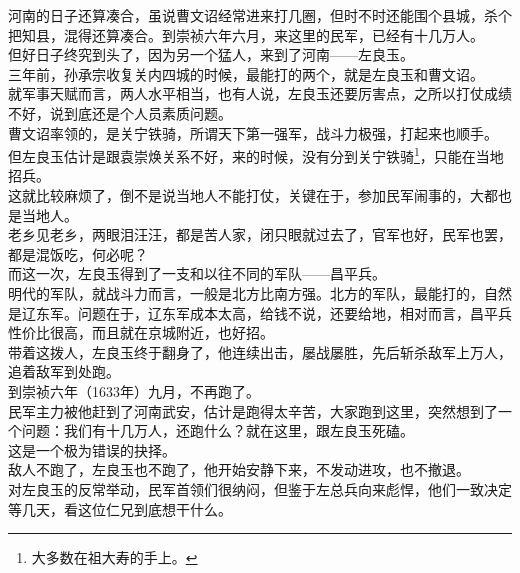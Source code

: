 \begin{multicols}{\theparacolNo}
河南的日子还算凑合，虽说曹文诏经常进来打几圈，但时不时还能围个县城，杀个把知县，混得还算凑合。到崇祯六年六月，来这里的民军，已经有十几万人。\\

但好日子终究到头了，因为另一个猛人，来到了河南——左良玉。\\

三年前，孙承宗收复关内四城的时候，最能打的两个，就是左良玉和曹文诏。\\

就军事天赋而言，两人水平相当，也有人说，左良玉还要厉害点，之所以打仗成绩不好，说到底还是个人员素质问题。\\

曹文诏率领的，是关宁铁骑，所谓天下第一强军，战斗力极强，打起来也顺手。\\

但左良玉估计是跟袁崇焕关系不好，来的时候，没有分到关宁铁骑\footnote{大多数在祖大寿的手上。}，只能在当地招兵。\\

这就比较麻烦了，倒不是说当地人不能打仗，关键在于，参加民军闹事的，大都也是当地人。\\

老乡见老乡，两眼泪汪汪，都是苦人家，闭只眼就过去了，官军也好，民军也罢，都是混饭吃，何必呢？\\

而这一次，左良玉得到了一支和以往不同的军队——昌平兵。\\

明代的军队，就战斗力而言，一般是北方比南方强。北方的军队，最能打的，自然是辽东军。问题在于，辽东军成本太高，给钱不说，还要给地，相对而言，昌平兵性价比很高，而且就在京城附近，也好招。\\

带着这拨人，左良玉终于翻身了，他连续出击，屡战屡胜，先后斩杀敌军上万人，追着敌军到处跑。\\

到崇祯六年（1633年）九月，不再跑了。\\

民军主力被他赶到了河南武安，估计是跑得太辛苦，大家跑到这里，突然想到了一个问题：我们有十几万人，还跑什么？就在这里，跟左良玉死磕。\\

这是一个极为错误的抉择。\\

敌人不跑了，左良玉也不跑了，他开始安静下来，不发动进攻，也不撤退。\\

对左良玉的反常举动，民军首领们很纳闷，但鉴于左总兵向来彪悍，他们一致决定等几天，看这位仁兄到底想干什么。\\


\end{multicols}
